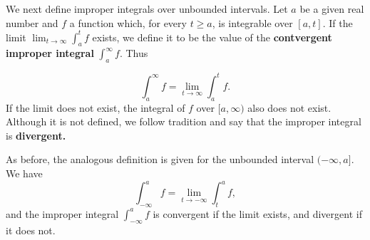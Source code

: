 We next define improper integrals over unbounded intervals. Let $a$ be a given real number and $f$ a function which, for every $t \geq a$, is integrable over $[a, t]$. If the limit $\lim_{t \rightarrow \infty} \int_a^t f$ exists, we define it to be the value of the \textbf{contvergent improper integral} $\int_a^\infty f$. Thus

$$
\int_a^\infty f = \lim_{t \rightarrow \infty} \int_a^t f.
$$
\noindent If the limit does not exist, the integral of  $f$ over $[a, \infty)$ also does not exist. Although it is not defined, we follow tradition and say that the improper integral is \textbf{divergent.}

As before, the analogous definition is given for the unbounded interval $(-\infty, a]$. We have
$$
\int_{-\infty}^a f = \lim_{t \rightarrow {-\infty}} \int_t^a f ,
$$
\noindent and the improper integral $\int_{-\infty}^a f$ is convergent if the limit exists, and divergent if it does not.

